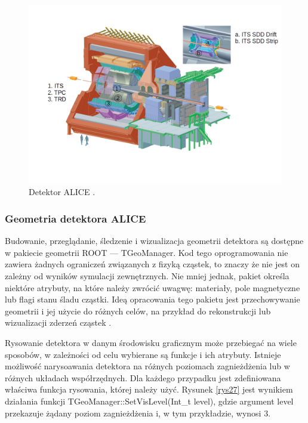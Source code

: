 \begin{figure}[H]
		\centering
 		\includegraphics[width=16.0cm]{detector.png}
    	\caption{Detektor ALICE \cite{aliceofficial}.}
 		\label{rys9}
\end{figure}
\subsubsection{Geometria detektora ALICE}
Budowanie, przeglądanie, śledzenie i wizualizacja geometrii detektora są dostępne w pakiecie geometrii ROOT --- TGeoManager. Kod tego oprogramowania nie zawiera żadnych ograniczeń związanych z fizyką cząstek, to znaczy że nie jest on zależny od wyników symulacji zewnętrznych. Nie mniej jednak, pakiet określa niektóre atrybuty, na które należy zwrócić uwagwę: materiały, pole magnetyczne lub flagi stanu śladu cząstki. Ideą opracowania tego pakietu jest przechowywanie geometrii i jej użycie do różnych celów, na przykład do rekonstrukcji lub wizualizacji zderzeń cząstek \cite{TGeoManager}. 

Rysowanie detektora w danym środowisku graficznym może przebiegać na wiele sposobów, w zależności od celu wybierane są funkcje i ich atrybuty. Istnieje możliwość narysoawania detektora na różnych poziomach zagnieżdżenia lub w różnych układach współrzędnych. Dla każdego przypadku jest zdefiniowana właściwa funkcja rysowania, której należy użyć. Rysunek \ref{rys27} jest wynikiem działania funkcji TGeoManager::SetVisLevel(Int\_t level), gdzie argument level przekazuje żądany poziom zagnieżdżenia i, w tym przykładzie, wynosi 3. 

